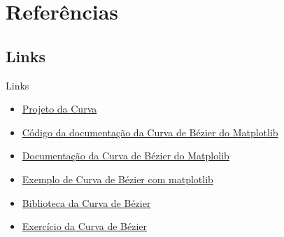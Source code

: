 \documentclass[10pt]{beamer}
\theoremstyle{definition}
\begin{document}
\section{Referências}
\subsection{Links}
\begin{frame}{Links}
    \begin{itemize}
        \item \hyperlink{https://github.com/oziieljuniior/GM}{Projeto da Curva}
        \item \hyperlink{https://github.com/matplotlib/matplotlib/blob/v3.6.3/lib/matplotlib/bezier.py#L181-L305}{Código da documentação da Curva de Bézier do Matplotlib} 
        \item \hyperlink{https://matplotlib.org/stable/api/bezier_api.html#module-matplotlib.bezier}{Documentação da Curva de Bézier do Matplolib}
        \item \hyperlink{https://matplotlib.org/stable/gallery/shapes_and_collections/quad_bezier.html}{Exemplo de Curva de Bézier com matplotlib}
        \item \hyperlink{https://github.com/torresjrjr/Bezier.py}{Biblioteca da Curva de Bézier}
        \item \hyperlink{https://github.com/izabelacborges/cg-curves-python}{Exercício da Curva de Bézier}
        
    \end{itemize}
    
\end{frame}
\end{document}
